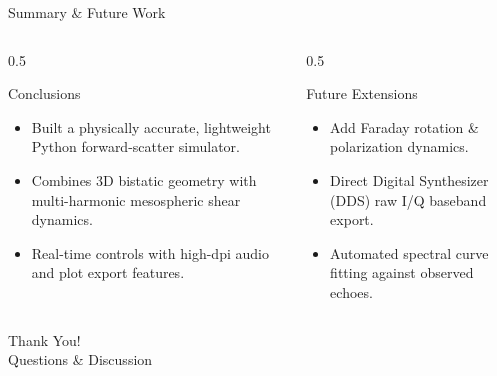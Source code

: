 \documentclass[aspectratio=169, 10pt]{beamer}
\begin{document}
\begin{frame}{Summary \& Future Work}
    \begin{columns}
        \begin{column}{0.5\textwidth}
            \begin{block}{Conclusions}
                \begin{itemize}
                    \item Built a physically accurate, lightweight Python forward-scatter simulator.
                    \item Combines 3D bistatic geometry with multi-harmonic mesospheric shear dynamics.
                    \item Real-time controls with high-dpi audio and plot export features.
                \end{itemize}
            \end{block}
        \end{column}
        \begin{column}{0.5\textwidth}
            \begin{block}{Future Extensions}
                \begin{itemize}
                    \item Add Faraday rotation & polarization dynamics.
                    \item Direct Digital Synthesizer (DDS) raw I/Q baseband export.
                    \item Automated spectral curve fitting against observed echoes.
                \end{itemize}
            \end{block}
        \end{column}
    \end{columns}
\end{frame}

\begin{frame}[standout]
    Thank You!\\
    \vspace{0.5cm}
    \large Questions \& Discussion
\end{frame}
\end{document}
